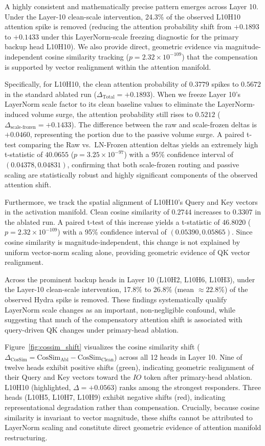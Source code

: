 \documentclass[10pt]{article} %
\begin{document}
A highly consistent and mathematically precise pattern emerges across Layer 10. Under the Layer-10 clean-scale intervention, 24.3\% of the observed L10H10 attention spike is removed (reducing the attention probability shift from $+0.1893$ to $+0.1433$ under this LayerNorm-scale freezing diagnostic for the primary backup head L10H10). We also provide direct, geometric evidence via magnitude-independent cosine similarity tracking ($p = 2.32 \times 10^{-109}$) that the compensation is supported by vector realignment within the attention manifold.

Specifically, for L10H10, the clean attention probability of $0.3779$ spikes to $0.5672$ in the standard ablated run ($\Delta_\text{Total} = +0.1893$). When we freeze Layer 10's LayerNorm scale factor to its clean baseline values to eliminate the LayerNorm-induced volume surge, the attention probability still rises to $0.5212$ ($\Delta_\text{scale-frozen} = +0.1433$). The difference between the raw and scale-frozen deltas is $+0.0460$, representing the portion due to the passive volume surge. A paired t-test comparing the Raw vs.\ LN-Frozen attention deltas yields an extremely high t-statistic of $40.0655$ ($p = 3.25 \times 10^{-97}$) with a 95\% confidence interval of $(0.04378, 0.04831)$, confirming that both scale-frozen routing and passive scaling are statistically robust and highly significant components of the observed attention shift.

Furthermore, we track the spatial alignment of L10H10's Query and Key vectors in the activation manifold. Clean cosine similarity of $0.2744$ increases to $0.3307$ in the ablated run. A paired t-test of this increase yields a t-statistic of $46.8020$ ($p = 2.32 \times 10^{-109}$) with a 95\% confidence interval of $(0.05390, 0.05865)$. Since cosine similarity is magnitude-independent, this change is not explained by uniform vector-norm scaling alone, providing geometric evidence of QK vector realignment.

Across the prominent backup heads in Layer 10 (L10H2, L10H6, L10H3), under the Layer-10 clean-scale intervention, 17.8\% to 26.8\% (mean $\approx 22.8\%$) of the observed Hydra spike is removed. These findings systematically qualify LayerNorm scale changes as an important, non-negligible confound, while suggesting that much of the compensatory attention shift is associated with query-driven QK changes under primary-head ablation.

Figure~\ref{fig:cossim_shift} visualizes the cosine similarity shift ($\Delta_\text{CosSim} = \text{CosSim}_\text{Abl} - \text{CosSim}_\text{Clean}$) across all 12 heads in Layer 10. Nine of twelve heads exhibit positive shifts (green), indicating geometric realignment of their Query and Key vectors toward the $IO$ token after primary-head ablation. L10H10 (highlighted, $\Delta = +0.0563$) ranks among the strongest responders. Three heads (L10H5, L10H7, L10H9) exhibit negative shifts (red), indicating representational degradation rather than compensation. Crucially, because cosine similarity is invariant to vector magnitude, these shifts cannot be attributed to LayerNorm scaling and constitute direct geometric evidence of attention manifold restructuring.
\end{document}
